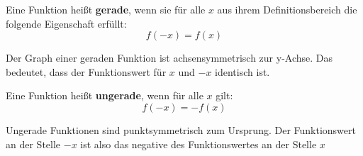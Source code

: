 \noindent
Eine Funktion heißt \textbf{gerade}, wenn sie für alle $x$ aus ihrem Definitionsbereich
die folgende Eigenschaft erfüllt:
\begin{equation}
f(-x) = f(x)
\end{equation}

\noindent
Der Graph einer geraden Funktion ist achsensymmetrisch zur y-Achse. Das bedeutet,
dass der Funktionswert für $x$ und $-x$ identisch ist.

\noindent
Eine Funktion heißt \textbf{ungerade}, wenn für alle $x$ gilt:
\begin{equation}
f(-x) = -f(x)
\end{equation}

\noindent
Ungerade Funktionen sind punktsymmetrisch zum Ursprung. Der Funktionswert an der
Stelle $-x$ ist also das negative des Funktionswertes an der Stelle $x$